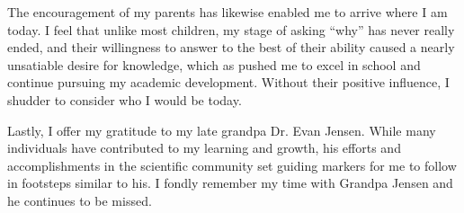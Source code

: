 The encouragement of my parents has likewise enabled me to arrive where I am today.  I feel that unlike most children, my stage of asking ``why'' has never really ended, and their willingness to answer to the best of their ability caused a nearly unsatiable desire for knowledge, which as pushed me to excel in school and continue pursuing my academic development.  Without their positive influence, I shudder to consider who I would be today.

Lastly, I offer my gratitude to my late grandpa Dr. Evan Jensen.  While many individuals have contributed to my learning and growth, his efforts and accomplishments in the scientific community set guiding markers for me to follow in footsteps similar to his.  I fondly remember my time with Grandpa Jensen and he continues to be missed.